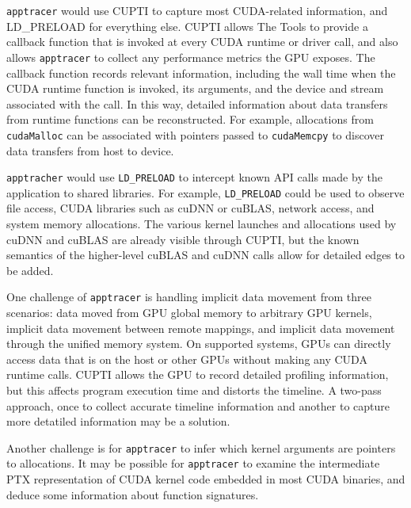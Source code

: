 \texttt{apptracer} would use CUPTI to capture most CUDA-related information, and LD\_PRELOAD for everything else.
CUPTI allows The Tools to provide a callback function that is invoked at every CUDA runtime or driver call, and also allows \texttt{apptracer} to collect any performance metrics the GPU exposes.
The callback function records relevant information, including the wall time when the CUDA runtime function is invoked, its arguments, and the device and stream associated with the call.
In this way, detailed information about data transfers from runtime functions can be reconstructed.
For example, allocations from \texttt{cudaMalloc} can be associated with pointers passed to \texttt{cudaMemcpy} to discover data transfers from host to device.

\texttt{apptracher} would use \texttt{LD\_PRELOAD} to intercept known API calls made by the application to shared libraries.
For example, \texttt{LD\_PRELOAD} could be used to observe file access, CUDA libraries such as cuDNN or cuBLAS, network access, and system memory allocations.
The various kernel launches and allocations used by cuDNN and cuBLAS are already visible through CUPTI, but the known semantics of the higher-level cuBLAS and cuDNN calls allow for detailed edges to be added.

One challenge of \texttt{apptracer} is handling implicit data movement from three scenarios:
data moved from GPU global memory to arbitrary GPU kernels, implicit data movement between remote mappings, and implicit data movement through the unified memory system.
On supported systems, GPUs can directly access data that is on the host or other GPUs without making any CUDA runtime calls.
CUPTI allows the GPU to record detailed profiling information, but this affects program execution time and distorts the timeline.
A two-pass approach, once to collect accurate timeline information and another to capture more detatiled information may be a solution.

Another challenge is for \texttt{apptracer} to infer which kernel arguments are pointers to allocations.
It may be possible for \texttt{apptracer} to examine the intermediate PTX representation of CUDA kernel code embedded in most CUDA binaries, and deduce some information about function signatures.

